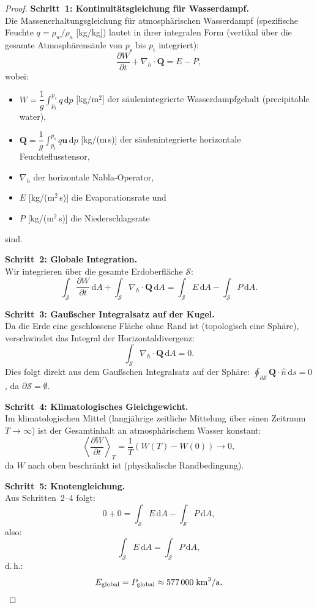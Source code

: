 ﻿\documentclass[a4paper,12pt]{article}
\theoremstyle{definition}
\begin{document}
\begin{proof}
  \textbf{Schritt~1: Kontinuitätsgleichung für Wasserdampf.}\\
  Die Massenerhaltungsgleichung für atmosphärischen Wasserdampf (spezifische
  Feuchte $q = \rho_w / \rho_a$ [kg/kg]) lautet in ihrer integralen Form
  (vertikal über die gesamte Atmosphärensäule von $p_\mathrm{s}$ bis $p_\mathrm{t}$
  integriert):
  \[
    \frac{\partial W}{\partial t} + \nabla_h \cdot \mathbf{Q}
    = E - P,
  \]
  wobei:
  \begin{itemize}
    \item $W = \dfrac{1}{g}\displaystyle\int_{p_t}^{p_s} q\, \mathrm{d}p$
      [kg/m$^2$] der säulenintegrierte Wasserdampfgehalt (precipitable water),
    \item $\mathbf{Q} = \dfrac{1}{g}\displaystyle\int_{p_t}^{p_s} q\mathbf{u}\, \mathrm{d}p$
      [kg/(m\,s)] der säulenintegrierte horizontale Feuchteflusstensor,
    \item $\nabla_h$ der horizontale Nabla-Operator,
    \item $E$ [kg/(m$^2$\,s)] die Evaporationsrate und
    \item $P$ [kg/(m$^2$\,s)] die Niederschlagsrate
  \end{itemize}
  sind.

  \textbf{Schritt~2: Globale Integration.}\\
  Wir integrieren über die gesamte Erdoberfläche $\mathcal{S}$:
  \[
    \int_\mathcal{S} \frac{\partial W}{\partial t}\, \mathrm{d}A
    + \int_\mathcal{S} \nabla_h \cdot \mathbf{Q}\, \mathrm{d}A
    = \int_\mathcal{S} E\, \mathrm{d}A - \int_\mathcal{S} P\, \mathrm{d}A.
  \]

  \textbf{Schritt~3: Gaußscher Integralsatz auf der Kugel.}\\
  Da die Erde eine geschlossene Fläche ohne Rand ist (topologisch eine
  Sphäre), verschwindet das Integral der Horizontaldivergenz:
  \[
    \int_\mathcal{S} \nabla_h \cdot \mathbf{Q}\, \mathrm{d}A = 0.
  \]
  Dies folgt direkt aus dem Gaußschen Integralsatz auf der Sphäre:
  $\oint_{\partial \mathcal{S}} \mathbf{Q} \cdot \hat{n}\, \mathrm{d}s = 0$,
  da $\partial \mathcal{S} = \emptyset$.

  \textbf{Schritt~4: Klimatologisches Gleichgewicht.}\\
  Im klimatologischen Mittel (langjährige zeitliche Mittelung über einen
  Zeitraum $T \to \infty$) ist der Gesamtinhalt an atmosphärischem Wasser
  konstant:
  \[
    \left\langle \frac{\partial W}{\partial t} \right\rangle_T
    = \frac{1}{T}\left(W(T) - W(0)\right) \longrightarrow 0,
  \]
  da $W$ nach oben beschränkt ist (physikalische Randbedingung).

  \textbf{Schritt~5: Knotengleichung.}\\
  Aus Schritten~2--4 folgt:
  \[
    0 + 0 = \int_\mathcal{S} E\, \mathrm{d}A - \int_\mathcal{S} P\, \mathrm{d}A,
  \]
  also:
  \[
    \int_\mathcal{S} E\, \mathrm{d}A = \int_\mathcal{S} P\, \mathrm{d}A,
  \]
  d.\,h.:
  \[
    E_\mathrm{global} = P_\mathrm{global} \approx 577\,000\;\text{km}^3/\text{a}. \qedhere
  \]
\end{proof}
\end{document}
